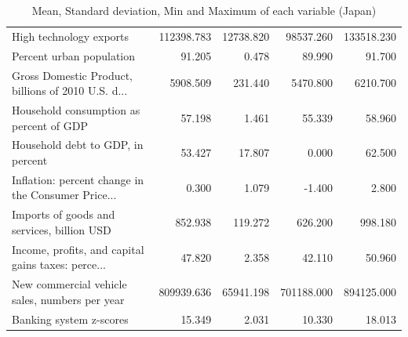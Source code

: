\documentclass[11pt]{article}
\begin{document}
\begin{table}[H]
{\begin{tabular}{lrrrr}
High technology exports                            &  112398.783 &  12738.820 &   98537.260 &  133518.230 \\
Percent urban population                           &      91.205 &      0.478 &      89.990 &      91.700 \\
Gross Domestic Product, billions of 2010 U.S. d... &    5908.509 &    231.440 &    5470.800 &    6210.700 \\
Household consumption as percent of GDP            &      57.198 &      1.461 &      55.339 &      58.960 \\
Household debt to GDP, in percent                  &      53.427 &     17.807 &       0.000 &      62.500 \\
Inflation: percent change in the Consumer Price... &       0.300 &      1.079 &      -1.400 &       2.800 \\
Imports of goods and services, billion USD         &     852.938 &    119.272 &     626.200 &     998.180 \\
Income, profits, and capital gains taxes: perce... &      47.820 &      2.358 &      42.110 &      50.960 \\
New commercial vehicle sales, numbers per year     &  809939.636 &  65941.198 &  701188.000 &  894125.000 \\
Banking system z-scores                            &      15.349 &      2.031 &      10.330 &      18.013 \\
\bottomrule
\end{tabular}}
\caption{Mean, Standard deviation, Min and Maximum of each variable (Japan)}
\label{tab:describe_jpn}
\end{table}
\end{document}

